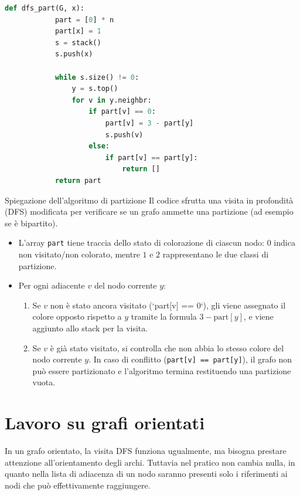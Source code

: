 \documentclass[12pt]{report}
\begin{document}
	\begin{lstlisting}[style=stile-listings, language=Python]
		def dfs_part(G, x):
			part = [0] * n
			part[x] = 1
			s = stack()
			s.push(x)
			
			while s.size() != 0:
				y = s.top()
				for v in y.neighbr:
					if part[v] == 0:
						part[v] = 3 - part[y]
						s.push(v)
					else:
						if part[v] == part[y]:
							return []
			return part
	\end{lstlisting}
	
	\begin{algoritmo}{Spiegazione dell'algoritmo di partizione}{}
		Il codice sfrutta una visita in profondità (DFS) modificata per verificare se un grafo ammette una partizione (ad esempio se è bipartito).
		\begin{itemize}
			\item L'array \texttt{part} tiene traccia dello stato di colorazione di ciascun nodo: $0$ indica non visitato/non colorato, mentre $1$ e $2$ rappresentano le due classi di partizione.
			\item Per ogni adiacente $v$ del nodo corrente $y$:
			\begin{enumerate}
				\item Se $v$ non è stato ancora visitato (`part[v] == 0`), gli viene assegnato il colore opposto rispetto a $y$ tramite la formula $3 - \text{part}[y]$, e viene aggiunto allo stack per la visita.
				
				\item Se $v$ è già stato visitato, si controlla che non abbia lo stesso colore del nodo corrente $y$. In caso di conflitto (\texttt{part[v] == part[y]}), il grafo non può essere partizionato e l'algoritmo termina restituendo una partizione vuota.
			\end{enumerate}
		\end{itemize}
		
	\end{algoritmo}
	
	\section{Lavoro su grafi orientati}
	
	In un grafo orientato, la visita DFS funziona ugualmente, ma bisogna prestare attenzione all'orientamento degli archi. Tuttavia nel pratico non cambia nulla, in quanto nella lista di adiacenza di un nodo saranno presenti solo i riferimenti ai nodi che può effettivamente raggiungere.
	
\end{document}
